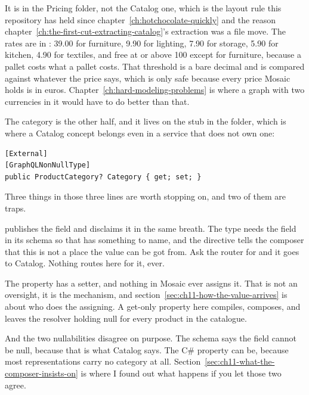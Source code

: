 %
It is in the Pricing folder, not the Catalog one, which is the layout rule this
repository has held since chapter~\ref{ch:hotchocolate-quickly} and the reason
chapter~\ref{ch:the-first-cut-extracting-catalog}'s extraction was a file move.
The rates are in : 39.00 for furniture,
9.90 for lighting, 7.90 for storage, 5.90 for kitchen, 4.90 for textiles, and
free at or above 100 except for furniture, because a pallet costs what a pallet
costs. That threshold is a bare decimal and is compared against whatever the
price says, which is only safe because every price Mosaic holds is in euros.
Chapter~\ref{ch:hard-modeling-problems} is where a graph with two currencies in
it would have to do better than that.

The category is the other half, and it lives on the  stub in the
 folder, which is where a Catalog concept belongs even in a
service that does not own one:

\begin{verbatim}
[External]
[GraphQLNonNullType]
public ProductCategory? Category { get; set; }
\end{verbatim}

Three things in those three lines are worth stopping on, and two of them are
traps.

%
\code{[External]} publishes the field and disclaims it in the same breath. The
type needs the field in its schema so that 
has something to name, and the directive tells the composer that this is not a
place the value can be got from. Ask the router for  and
it goes to Catalog. Nothing routes here for it, ever.

%
The property has a setter, and nothing in Mosaic ever assigns it. That is not
an oversight, it is the mechanism, and
section~\ref{sec:ch11-how-the-value-arrives} is about who does the assigning. A
get-only property here compiles, composes, and leaves the resolver holding
null for every product in the catalogue.

And the two nullabilities disagree on purpose. The schema says the field cannot
be null, because that is what Catalog says. The C\# property can be, because
most representations carry no category at all.
Section~\ref{sec:ch11-what-the-composer-insists-on} is where I found out what
happens if you let those two agree.

